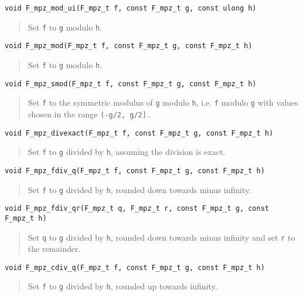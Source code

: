 \documentclass[a4paper,10pt]{article}
\newcommand{\code}{\lstinline}
\begin{document}
\begin{lstlisting}
void F_mpz_mod_ui(F_mpz_t f, const F_mpz_t g, const ulong h)
\end{lstlisting}
\begin{quote}
Set \code{f} to \code{g} modulo \code{h}.
\end{quote}

\begin{lstlisting}
void F_mpz_mod(F_mpz_t f, const F_mpz_t g, const F_mpz_t h)
\end{lstlisting}
\begin{quote}
Set \code{f} to \code{g} modulo \code{h}.
\end{quote}

\begin{lstlisting}
void F_mpz_smod(F_mpz_t f, const F_mpz_t g, const F_mpz_t h)
\end{lstlisting}
\begin{quote}
Set \code{f} to the symmetric modulus of \code{g} modulo \code{h}, i.e. \code{f} modulo \code{g} with values chosen in the range \code{(-g/2, g/2]}..
\end{quote}

\begin{lstlisting}
void F_mpz_divexact(F_mpz_t f, const F_mpz_t g, const F_mpz_t h)
\end{lstlisting}
\begin{quote}
Set \code{f} to \code{g} divided by \code{h}, assuming the division is exact.
\end{quote}

\begin{lstlisting}
void F_mpz_fdiv_q(F_mpz_t f, const F_mpz_t g, const F_mpz_t h)
\end{lstlisting}
\begin{quote}
Set \code{f} to \code{g} divided by \code{h}, rounded down towards minus infinity.
\end{quote}

\begin{lstlisting}
void F_mpz_fdiv_qr(F_mpz_t q, F_mpz_t r, const F_mpz_t g, const F_mpz_t h)
\end{lstlisting}
\begin{quote}
Set \code{q} to \code{g} divided by \code{h}, rounded down towards minus infinity and set \code{r} to the remainder.
\end{quote}

\begin{lstlisting}
void F_mpz_cdiv_q(F_mpz_t f, const F_mpz_t g, const F_mpz_t h)
\end{lstlisting}
\begin{quote}
Set \code{f} to \code{g} divided by \code{h}, rounded up towards infinity.
\end{quote}
\end{document}
